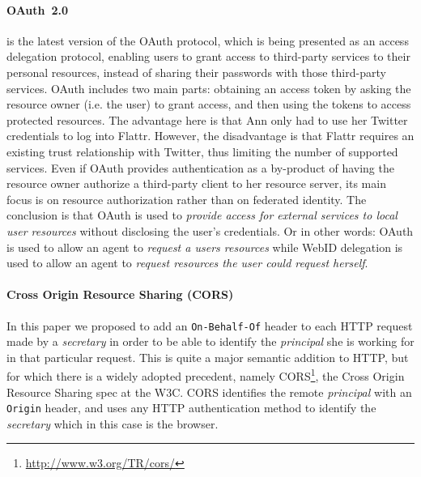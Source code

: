 \documentclass[a4paper]{llncs}
\begin{document}
\paragraph{OAuth~2.0}\cite{hardt-d-2012--a} is the latest version of the OAuth protocol, which is being presented as an access delegation protocol, enabling users to grant access to third-party services to their personal resources, instead of sharing their passwords with those third-party services.
OAuth includes two main parts: obtaining an access token by asking the resource owner (i.e. the user) to grant access, and then using the tokens to access protected resources. 
The advantage here is that Ann only had to use her Twitter credentials to log into Flattr.  However, the disadvantage is that Flattr requires an existing trust relationship with Twitter, thus limiting the number of supported services.
Even if OAuth provides authentication as a by-product of having the resource owner authorize a third-party client to her resource server, its main focus is on resource authorization rather than on federated identity.
The conclusion is that OAuth is used to \textit{provide access for external services to local user resources} without disclosing the user's credentials.
Or in other words: OAuth is used to allow an agent to \textit{request a users resources} while WebID delegation is used to allow an agent to \textit{request resources the user could request herself}.

\paragraph{Cross Origin Resource Sharing (CORS)}
In this paper we proposed to add an \lstinline|On-Behalf-Of| header to each HTTP request made by a \textit{secretary} in order to be able to identify the \textit{principal} she is working for in that particular request.
This is quite a major semantic addition to HTTP, but for which there is a widely adopted precedent, namely CORS\footnote{\url{http://www.w3.org/TR/cors/}}, the Cross Origin Resource Sharing spec at the W3C.
CORS identifies the remote \textit{principal} with an \lstinline|Origin| header, and uses any HTTP authentication method to identify the \textit{secretary} which in this case is the browser.
\end{document}
